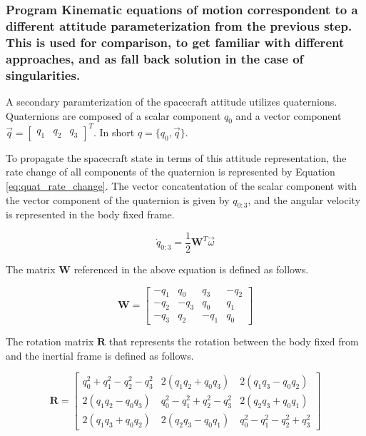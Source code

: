 \subsubsection{Program Kinematic equations of motion correspondent to a different attitude parameterization from the previous step. This is used for comparison, to get familiar with different approaches, and as fall back solution in the case of singularities.}

A secondary paramterization of the spacecraft attitude utilizes quaternions. Quaternions are composed of a scalar component $q_0$ and a vector component $\vec{q} = \begin{bmatrix}  q_1 & q_2 & q_3  \end{bmatrix}^T$. In short $q = \{q_0, \vec{q}\}$. 

To propagate the spacecraft state in terms of this attitude representation, the rate change of all components of the quaternion is represented by Equation \ref{eq:quat_rate_change}. The vector concatentation of the scalar component with the vector component of the quaternion is given by $q_{0:3}$, and the angular velocity is represented in the body fixed frame.

\begin{equation} \label{eq:quat_rate_change}
    \dot{q}_{0:3} = \frac{1}{2} \boldsymbol{W}^T \vec{\omega}
\end{equation}

The matrix $\boldsymbol{W}$ referenced in the above equation is defined as follows.

\begin{equation*}
    \boldsymbol{W} = \begin{bmatrix}
        -q_1 & q_0 & q_3 & -q_2 \\
        -q_2 & -q_3 & q_0 & q_1 \\
        -q_3 & q_2 & -q_1 & q_0
    \end{bmatrix}
\end{equation*}

The rotation matrix $\boldsymbol{R}$ that represents the rotation between the body fixed from and the inertial frame is defined as follows.

\begin{equation*}
    \boldsymbol{R} = \begin{bmatrix}
        q_0^2 + q_1^2 - q_2^2 - q_3^2 & 2(q_1q_2 + q_0q_3) & 2(q_1q_3 - q_0q_2) \\
        2(q_1q_2 - q_0q_3) & q_0^2 - q_1^2 + q_2^2 - q_3^2 & 2(q_2q_3 + q_0q_1) \\
        2(q_1q_3 + q_0q_2) & 2(q_2q_3 - q_0q_1) & q_0^2 - q_1^2 - q_2^2 + q_3^2
    \end{bmatrix}
\end{equation*}

